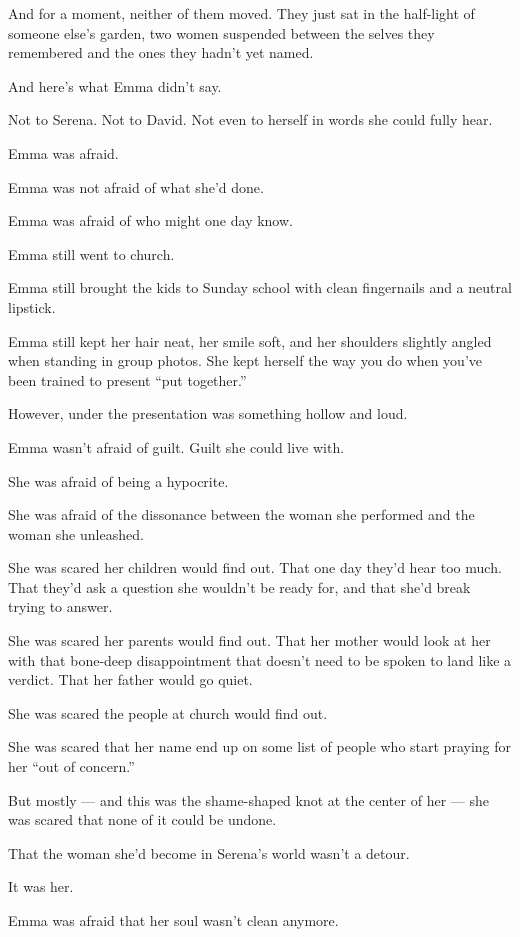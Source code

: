 And for a moment, neither of them moved. They just sat in the half-light of someone else’s garden, 
two women suspended between the selves they remembered and the ones they hadn’t yet named.

And here’s what Emma didn’t say.

Not to Serena.
Not to David.
Not even to herself in words she could fully hear.

Emma was afraid. 

Emma was not afraid of what she’d done.

Emma was afraid of who might one day know.

Emma still went to church.

Emma still brought the kids to Sunday school with clean fingernails and a neutral lipstick.

Emma still kept her hair neat, her smile soft, and her shoulders slightly angled when standing in group 
photos. She kept herself the way you do when you’ve been trained to present ``put together.''

However, under the presentation was something hollow and loud.

Emma wasn’t afraid of guilt. Guilt she could live with.

She was afraid of being a hypocrite.

She was afraid of the dissonance between the woman she performed and the woman she unleashed.

She was scared her children would find out.
That one day they’d hear too much. That they'd ask a question she wouldn't be ready 
for, and that she'd break trying to answer.

She was scared her parents would find out.
That her mother would look at her with that bone-deep disappointment that doesn’t need to be spoken to 
land like a verdict.
That her father would go quiet.

She was scared the people at church would find out.

She was scared that her name end up on some list of people who start praying for her ``out of concern.''

But mostly --- and this was the shame-shaped knot at the center of her ---
she was scared that none of it could be undone.

That the woman she’d become in Serena’s world wasn’t a detour.

It was her.

Emma was afraid that her soul wasn’t clean anymore. 

